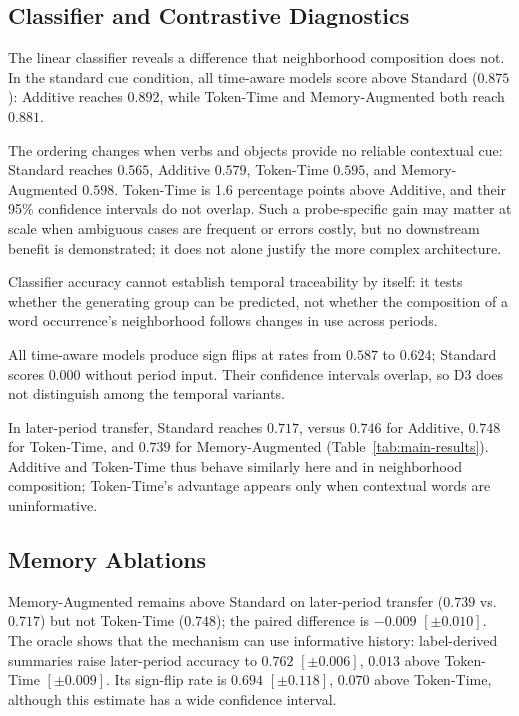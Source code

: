 \documentclass[runningheads]{llncs}
\begin{document}
\subsection{Classifier and Contrastive Diagnostics}
The linear classifier reveals a difference that neighborhood composition does not. In
the standard cue condition, all time-aware models score above Standard
(\(0.875\)): Additive reaches \(0.892\), while Token-Time and
Memory-Augmented both reach \(0.881\).

The ordering changes when verbs and objects provide no reliable contextual cue:
Standard reaches \(0.565\), Additive \(0.579\), Token-Time \(0.595\), and
Memory-Augmented \(0.598\). Token-Time is 1.6 percentage points above
Additive, and their 95\% confidence intervals do not overlap.
Such a probe-specific gain may matter at scale when ambiguous cases are frequent
or errors costly, but no downstream benefit is demonstrated; it does not alone
justify the more complex architecture.

Classifier accuracy cannot establish temporal traceability by itself: it tests
whether the generating group can be predicted, not whether the composition of
a word occurrence's neighborhood follows changes in use across periods.

All time-aware models produce sign flips at rates from \(0.587\) to \(0.624\);
Standard scores \(0.000\) without period input. Their confidence intervals
overlap, so D3 does not distinguish among the temporal variants.

In later-period transfer, Standard reaches \(0.717\), versus \(0.746\) for
Additive, \(0.748\) for Token-Time, and \(0.739\) for Memory-Augmented
(Table~\ref{tab:main-results}). Additive and Token-Time thus behave similarly
here and in neighborhood composition; Token-Time's advantage appears only when
contextual words are uninformative.

\subsection{Memory Ablations}
Memory-Augmented remains above Standard on later-period transfer (\(0.739\) vs.\
\(0.717\)) but not Token-Time (\(0.748\)); the paired difference is \(-0.009\)
\([\pm0.010]\). The oracle shows that the mechanism can use informative
history: label-derived summaries raise later-period accuracy to \(0.762\)
\([\pm0.006]\), \(0.013\) above Token-Time \([\pm0.009]\). Its sign-flip rate
is \(0.694\) \([\pm0.118]\), \(0.070\) above Token-Time, although this estimate
has a wide confidence interval.
\end{document}
